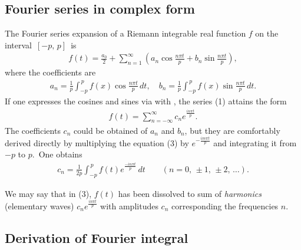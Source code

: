 \documentclass[12pt]{article}
\theoremstyle{definition}
\begin{document}
 

\subsection{Fourier series in complex form}

The Fourier series expansion of a Riemann integrable real function $f$ on the interval \,$[-p,\,p]$\, is
\begin{align}
f(t) = \frac{a_0}{2}+\sum_{n=1}^\infty\left(a_n\cos{\frac{n\pi t}{p}}+b_n\sin{\frac{n\pi t}{p}}\right),
\end{align}
where the coefficients are
\begin{align}
a_n = \frac{1}{p}\int_{-p}^{\,p}f(x)\cos{\frac{n\pi t}{p}}\,dt, \quad
b_n = \frac{1}{p}\int_{-p}^{\,p}f(x)\sin{\frac{n\pi t}{p}}\,dt.
\end{align}
If one expresses the cosines and sines via  with , the series (1) attains the form
\begin{align}
f(t) = \sum_{n=-\infty}^\infty c_ne^{\frac{in\pi t}{p}}.
\end{align}
The coefficients $c_n$ could be obtained of $a_n$ and $b_n$, but they are comfortably derived directly by multiplying the equation (3) by $e^{-\frac{im\pi t}{p}}$ and integrating it from $-p$ to $p$.\, One obtains
\begin{align}
c_n = \frac{1}{2p}\int_{-p}^{\,p}f(t)e^{\frac{-in\pi t}{p}}\,dt \qquad (n = 0,\,\pm1,\,\pm2,\,\ldots).
\end{align}

We may say that in (3), $f(t)$ has been dissolved to sum of {\em harmonics} (elementary waves) $c_ne^{\frac{in\pi t}{p}}$ with amplitudes $c_n$ corresponding the frequencies $n$.

\subsection{Derivation of Fourier integral}
\end{document}
